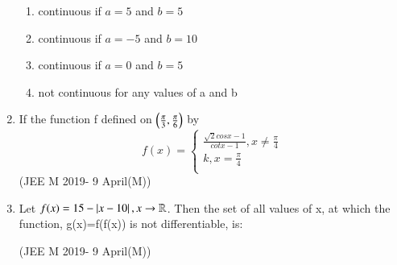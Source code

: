\documentclass[journal,12pt,twocolumn]{IEEEtran}
\theoremstyle{remark}
\begin{document}
\begin{enumerate}
	\begin{enumerate}[label=(\alph*)]
		\item continuous if $a=5$ and $b=5$
		\item continuous if $a=-5$ and $b=10$
		\item continuous if $a=0$ and $b=5$
		\item not continuous for any values of a and b
	\end{enumerate}
\item If the function f defined on $ \left( \frac{\pi}{3}, \frac{\pi}{6}\right)$ by
	\begin{equation}
	    f(x)= 
	    \begin{cases}
	    \frac{\sqrt{2} cosx-1}{cotx-1}, x \ne \frac{\pi}{4}\\
	    k, x = \frac{\pi}{4}\\
	    \end{cases}
	\end{equation}
	\hfill{(JEE M 2019- 9 April(M))}
	\begin{enumerate}[label=(\alph*)]
	\end{enumerate}
\item Let $f(x)= 15-\left\vert x-10\right\vert, x\to\mathbb{R}$. Then the set of all values of x, at which the function, g(x)=f(f(x)) is not differentiable, is:

	\hfill{(JEE M 2019- 9 April(M))}
	\begin{enumerate}[label=(\alph*)]
	\end{enumerate}
\end{enumerate}
\end{document}
